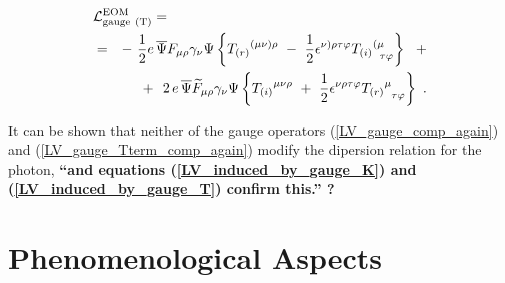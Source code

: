 \documentclass[a4paper,12pt]{article}
\begin{document}
\begin{eqnarray}
\nonumber
        \lefteqn{
        \mathcal{L}_{\rm gauge\ (T)}^{\rm EOM} = } \\
\label{LV_induced_by_gauge_T}
	& = &
	-~ \frac{1}{2} e \, \overline{\Psi} F_{\mu\rho} 
	                    \gamma_\nu \Psi 
	\left\{
	{T_{(r)}}^{(\mu\nu)\rho} 
	~-~
	\frac{1}{2} \epsilon^{\nu)\rho\tau\varphi}
	{T_{(i)}}^{(\mu}_{\phantom{\mu}\tau\varphi}
	\right\}
	~~+
	\\
\nonumber
	&&
	+~~
	2\, 
	e\, \overline{\Psi} \widetilde{F}_{\mu\rho}
	        \gamma_\nu \Psi
	\left\{
	   {T_{(i)}}^{\mu\nu\rho} 
	   ~+~
	   \frac{1}{2} \epsilon^{\nu\rho\tau\varphi}
	   {T_{(r)}}^\mu_{\phantom{\mu}\tau\varphi}
	\right\}~.
\end{eqnarray}

	It can be shown 
\cite{GrootNibbelink:2004za}
	that neither of the gauge operators 
	(\ref{LV_gauge_comp_again}) and
	(\ref{LV_gauge_Tterm_comp_again}) 
	modify the dipersion relation for the photon,
	{\bf ``and equations (\ref{LV_induced_by_gauge_K})
	  and (\ref{LV_induced_by_gauge_T}) confirm this.'' ?}


\section{Phenomenological Aspects}
\end{document}
